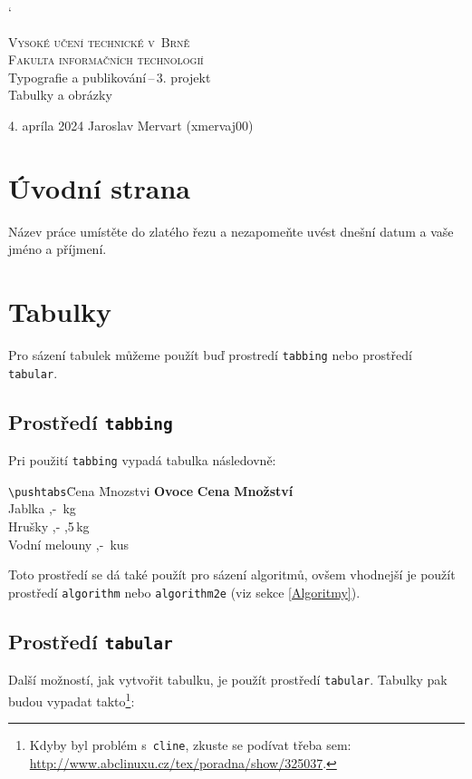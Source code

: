 \documentclass[11pt]{article}
\begin{document}
\catcode`
\begin{titlepage}
\begin{center}
    \Huge
	\textsc{Vysoké učení technické v~Brně}\\
    \huge
	{\textsc{Fakulta informačních technologií }}\\
	
	\LARGE
	Typografie a publikování\,--\,3. projekt\\
	\Huge
    Tabulky a obrázky\\
	
\end{center}
{\Large 4. apríla 2024 \hfill
Jaroslav Mervart (xmervaj00)}
\end{titlepage}

\section{Úvodní strana}
Název práce umístěte do zlatého řezu a nezapomeňte uvést dnešní datum a vaše jméno a příjmení.
\section{Tabulky}
Pro sázení tabulek můžeme použít buď prostredí \texttt{tabbing} nebo prostředí \texttt{tabular}.
\subsection{Prostředí \texttt{tabbing}}
Pri použití \texttt{tabbing} vypadá tabulka následovně:
\begin{tabbing}
\verb|\pushtabs|\qquad\quad \= Cena \quad \= Mnozstvi \kill
\textbf{Ovoce} \> \textbf{Cena} \> \textbf{Množství} \\
Jablka ,- \,kg \\
Hrušky ,- ,5\,kg \\
Vodní melouny ,- \,kus \\
\end{tabbing}

\noindent Toto prostředí se dá také použít pro sázení algoritmů, ovšem vhodnejší je použít prostředí \texttt{algorithm} nebo \texttt{algorithm2e} (viz sekce \ref{Algoritmy}).

\subsection{Prostředí \texttt{tabular}}
Další možností, jak vytvořit tabulku, je použít prostředí \texttt{tabular}. Tabulky pak budou vypadat takto\footnote{Kdyby byl problém s~\texttt{cline}, zkuste se podívat třeba sem: \href{http://www.abclinuxu.cz/tex/poradna/show/325037}{http://www.abclinuxu.cz/tex/poradna/show/325037}. }:
\end{document}
